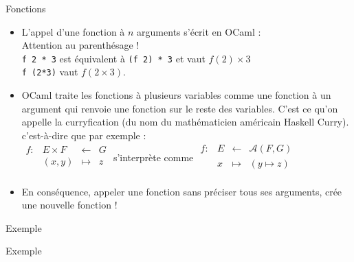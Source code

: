 \documentclass[10pt]{beamer}
\begin{document}
\begin{frame}{\Ctitle}{\stitle}
	\begin{block}{Fonctions}
		\begin{itemize}
			\item <1-> L'appel d'une fonction  à $n$ arguments s'écrit en OCaml :   \\
			      \textcolor{BrickRed}{\danger \;} Attention au parenthésage ! \\
			      {\tt f 2 * 3} est équivalent à {\tt (f 2) * 3} et vaut $f(2) \times 3$ \\
			      {\tt f (2*3)} vaut $f(2\times3)$.
			\item<2-> OCaml traite les fonctions à plusieurs variables comme une fonction à un argument qui renvoie une fonction sur le reste des variables. C'est ce qu'on appelle la \textcolor{BrickRed}{curryfication} (du nom du mathématicien américain Haskell Curry). c'est-à-dire que par exemple : \\
				$\begin{array}{llll}
						f : & E \times F & \leftarrow & G \\
						    & (x,y)      & \mapsto    & z \\
					\end{array}$ s'interprète comme
				$\begin{array}{llll}
						f : & E & \leftarrow & \mathcal{A}{(F,G)} \\
						    & x & \mapsto    & (y \mapsto z)      \\
					\end{array}$
			\item<3-> En conséquence, appeler une fonction sans préciser tous ses arguments, crée une nouvelle fonction !
		\end{itemize}
	\end{block}
\end{frame}

\begin{frame}{\Ctitle}{\stitle}
	\begin{exampleblock}{Exemple}
	\end{exampleblock}
\end{frame}

\begin{frame}{\Ctitle}{\stitle}
	\begin{exampleblock}{Exemple}
	\end{exampleblock}
\end{frame}
\end{document}
